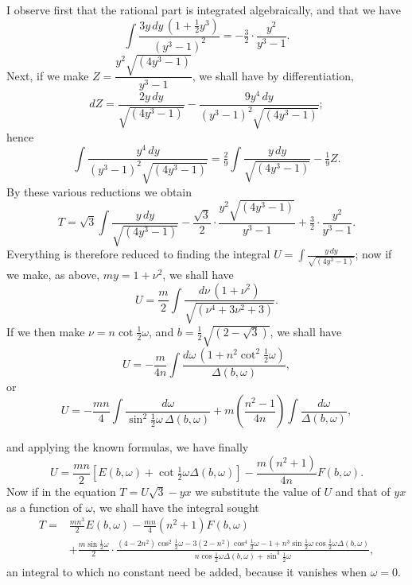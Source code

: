 \documentclass{article}
\begin{document}
I observe first that the rational part is integrated algebraically, and that we have
\[ \int\frac{3y\,dy\,(1+\tfrac{1}{2}y^{3})}{(y^{3}-1)^{2}}=-\tfrac{3}{2}\cdot\frac{y^{2}}{y^{3}-1}. \]
Next, if we make $Z=\dfrac{y^{2}\sqrt{(4y^{3}-1)}}{y^{3}-1}$, we shall have by differentiation,
\[ dZ=\frac{2y\,dy}{\sqrt{(4y^{3}-1)}}-\frac{9y^{4}\,dy}{(y^{3}-1)^{2}\sqrt{(4y^{3}-1)}}; \]
hence
\[ \int\frac{y^{4}\,dy}{(y^{3}-1)^{2}\sqrt{(4y^{3}-1)}}=\tfrac{2}{9}\int\frac{y\,dy}{\sqrt{(4y^{3}-1)}}-\tfrac{1}{9}Z. \]
By these various reductions we obtain
\[ T=\sqrt{3}\int\frac{y\,dy}{\sqrt{(4y^{3}-1)}}-\frac{\sqrt{3}}{2}\cdot\frac{y^{2}\sqrt{(4y^{3}-1)}}{y^{3}-1}+\tfrac{3}{2}\cdot\frac{y^{2}}{y^{3}-1}. \]
Everything is therefore reduced to finding the integral $U=\displaystyle\int\frac{y\,dy}{\sqrt{(4y^{3}-1)}}$; now if we make, as above, $my=1+\nu^{2}$, we shall have
\[ U=\frac{m}{2}\int\frac{d\nu\,(1+\nu^{2})}{\sqrt{(\nu^{4}+3\nu^{2}+3)}}. \]
If we then make $\nu=n\cot\frac{1}{2}\omega$, and $b=\frac{1}{2}\sqrt{(2-\sqrt{3})}$, we shall have
\[ U=-\frac{m}{4n}\int\frac{d\omega\,(1+n^{2}\cot^{2}\tfrac{1}{2}\omega)}{\Delta(b,\omega)}, \]
or
\[ U=-\frac{mn}{4}\int\frac{d\omega}{\sin^{2}\tfrac{1}{2}\omega\,\Delta(b,\omega)}+m\left(\frac{n^{2}-1}{4n}\right)\int\frac{d\omega}{\Delta(b,\omega)}, \]

and applying the known formulas, we have finally
\[ U=\frac{mn}{2}[E(b,\omega)+\cot\tfrac{1}{2}\omega\Delta(b,\omega)]-\frac{m(n^{2}+1)}{4n}F(b,\omega). \]
Now if in the equation $T=U\sqrt{3}-yx$ we substitute the value of $U$ and that of $yx$ as a function of $\omega$, we shall have the integral sought
\[ \begin{aligned} T={}&\frac{mn^{3}}{2}E(b,\omega)-\frac{mn}{4}(n^{2}+1)F(b,\omega)\\ &+\frac{m\sin\tfrac{1}{2}\omega}{2}\cdot\frac{(4-2n^{2})\cos^{2}\tfrac{1}{2}\omega-3(2-n^{2})\cos^{4}\tfrac{1}{2}\omega-1+n^{3}\sin\tfrac{1}{2}\omega\cos\tfrac{1}{2}\omega\Delta(b,\omega)}{n\cos\tfrac{1}{2}\omega\Delta(b,\omega)+\sin^{3}\tfrac{1}{2}\omega}, \end{aligned} \]
an integral to which no constant need be added, because it vanishes when $\omega=0$.
\end{document}
